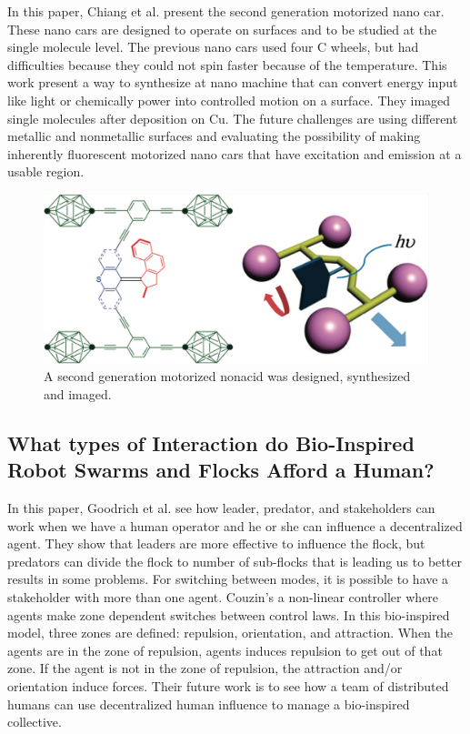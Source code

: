 \documentclass[letterpaper, 10 pt, conference]{ieeeconf}
\begin{document}
In this paper, Chiang et al. present the second generation motorized nano car.\cite{TourNanocar2012} These nano cars are designed to operate on surfaces and to be studied at the single molecule level. The previous nano cars used four C wheels, but had difficulties because they could not spin faster because of the temperature. This work present a way to synthesize at nano machine that can convert energy input like light or chemically power into controlled motion on a surface. They imaged single molecules after deposition on Cu. The future challenges are using different metallic and nonmetallic surfaces and evaluating the possibility of making inherently fluorescent motorized nano cars that have excitation and emission at a usable region. 
\begin{figure}[h]
\begin{center}
\includegraphics[width=\columnwidth]{nanocar.png}
\caption{A second generation motorized nonacid was designed, synthesized and imaged.\cite{TourNanocar2012}
\label{fig:nanocar}}
\end{center}
\end{figure}
\subsection{What types of Interaction do Bio-Inspired Robot Swarms and Flocks Afford a Human?}

In this paper, Goodrich et al. see how leader, predator, and stakeholders can work when we have a human operator and he or she can influence a decentralized agent.\cite{Goodrich2012} They show that leaders are more effective to influence the flock, but predators can divide the flock to number of sub-flocks that is leading us to better results in some problems. For switching between modes, it is possible to have a stakeholder with more than one agent. Couzin's a non-linear controller where agents make zone dependent switches between control laws. In this bio-inspired model, three zones are defined: repulsion, orientation, and attraction. When the agents are in the zone of repulsion, agents induces repulsion to get out of that zone. If the agent is not in the zone of repulsion, the attraction and/or orientation induce forces. Their future work is to see how a team of distributed humans can use decentralized human influence to manage a bio-inspired collective.
\end{document}
